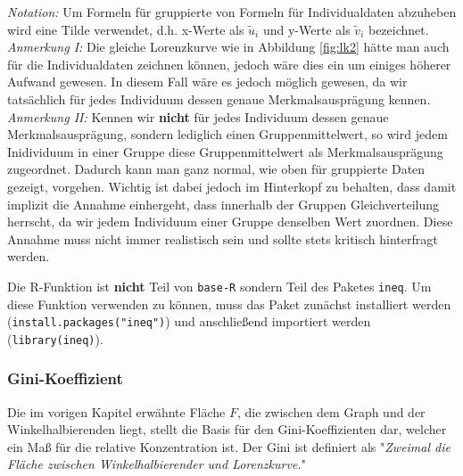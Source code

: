 \documentclass[a4paper]{article}
\newcommand\dangersign[1][2ex]{%
  \renewcommand\stacktype{L}%
  \scaleto{\stackon[1.3pt]{\color{red}$\triangle$}{\tiny !}}{#1}%
}
\begin{document}
\noindent \dangersign[3ex] \textit{Notation:} Um Formeln für gruppierte von Formeln für Individualdaten abzuheben wird eine Tilde verwendet, d.h. x-Werte als $\tilde u_i$ und y-Werte als $\tilde v_i$ bezeichnet.\\
\noindent \dangersign[3ex] \textit{Anmerkung I:} Die gleiche Lorenzkurve wie in Abbildung \ref{fig:lk2} hätte man auch für die Individualdaten zeichnen können, jedoch wäre dies ein um einiges höherer Aufwand gewesen. In diesem Fall wäre es jedoch möglich gewesen, da wir tatsächlich für jedes Individuum dessen genaue Merkmalsausprägung kennen.\\
\noindent \dangersign[3ex] \textit{Anmerkung II:} Kennen wir \textbf{nicht} für jedes Individuum dessen genaue Merkmalsausprägung, sondern lediglich einen Gruppenmittelwert, so wird jedem Inidividuum in einer Gruppe diese Gruppenmittelwert als Merkmalsausprägung zugeordnet. Dadurch kann man ganz normal, wie oben für gruppierte Daten gezeigt, vorgehen. Wichtig ist dabei jedoch im Hinterkopf zu behalten, dass damit implizit die Annahme einhergeht, dass innerhalb der Gruppen Gleichverteilung herrscht, da wir jedem Individuum einer Gruppe denselben Wert zuordnen. Diese Annahme muss nicht immer realistisch sein und sollte stets kritisch hinterfragt werden.\\

\noindent {}

\noindent \dangersign[3ex] Die R-Funktion ist \textbf{nicht} Teil von \texttt{base-R} sondern Teil des Paketes \texttt{ineq}. Um diese Funktion verwenden zu können, muss das Paket zunächst installiert werden (\texttt{install.packages("ineq")}) und anschließend importiert werden (\texttt{library(ineq)}).

\clearpage

\subsubsection{Gini-Koeffizient}\label{sec:gini}
Die im vorigen Kapitel erwähnte Fläche $F$, die zwischen dem Graph und der Winkelhalbierenden liegt, stellt die Basis für den Gini-Koeffizienten dar, welcher ein Maß für die relative Konzentration ist. Der Gini ist definiert als "\textit{Zweimal die Fläche zwischen Winkelhalbierender und Lorenzkurve.}"\\
\end{document}
